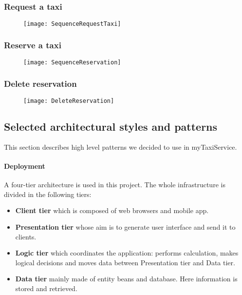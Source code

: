 \newpage
\subsubsection{Request a taxi} %
\begin{figure}[h!]
    \centering
    \texttt{[image: SequenceRequestTaxi]}
\end{figure}

\newpage
\subsubsection{Reserve a taxi} %
\begin{figure}[h!]
    \centering
    \texttt{[image: SequenceReservation]}
\end{figure}

\newpage
\subsubsection{Delete reservation} %
\begin{figure}[h!]
    \centering
    \texttt{[image: DeleteReservation]}
\end{figure}

\newpage
\subsection{Selected architectural styles and patterns}
This section describes high level patterns we decided to use in myTaxiService.

\paragraph{Deployment} A four-tier architecture is used in this project.
The whole infrastructure is divided in the following tiers:

\begin{itemize}
    \item{\textbf{Client tier} which is composed of web browsers and mobile app.}
    \item{\textbf{Presentation tier} whose aim is to generate user interface and send it to clients.}
    \item{\textbf{Logic tier} which coordinates the application: performs calculation, makes logical decisions and moves data between Presentation tier and Data tier.}
    \item{\textbf{Data tier} mainly made of entity beans and database. 
    Here information is stored and retrieved.}
\end{itemize}

